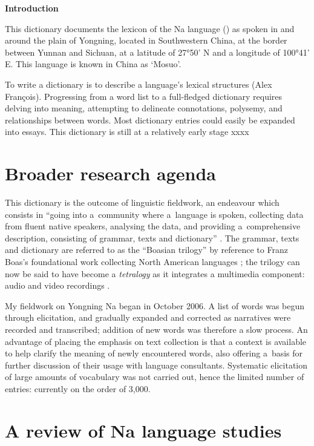 	{\LARGE \textbf{Introduction}}

This dictionary documents the lexicon of the Na language () as spoken in and around the plain of Yongning, located in Southwestern China, at the border between Yunnan and Sichuan, at a latitude of 27°50’ N and a longitude of 100°41’ E. This language is known in China as ‘Mosuo'. 

To write a dictionary is to describe a language's lexical structures (Alex François). Progressing from a word list to a full-fledged dictionary requires delving into meaning, attempting to delineate connotations, polysemy, and relationships between words. Most dictionary entries could easily be expanded into essays. This dictionary is still at a relatively early stage xxxx


	\section{Broader research agenda} \label{sec:researchagenda}
	
	This dictionary is the outcome of linguistic fieldwork, an endeavour which consists in “going into a~community
	where a~language is spoken, collecting data from fluent native speakers, analysing the data, and
	providing a~comprehensive description, consisting of grammar, texts and dictionary”
	\citep[12]{Dixon2007}. The grammar, texts and dictionary are referred to as the “Boasian trilogy” \citep{foley1999} by reference to Franz Boas’s foundational work collecting North American languages \citep{boas1902, boasetal1911}; the trilogy can now be said to have become a \textit{tetralogy} as it integrates a multimedia component: audio and video recordings \citep{musgraveetal2014}. 
	
	My fieldwork on Yongning Na began in October 2006. A list of words was begun through elicitation, and gradually expanded and corrected as narratives were recorded and transcribed; addition of new words was therefore a slow process. An advantage of placing the emphasis on text collection is that a context is available to help clarify the meaning of newly encountered words, also offering a~basis for further discussion of their usage with language consultants. Systematic elicitation of large amounts of vocabulary was not carried out, hence the limited number of entries: currently on the order of 3,000.

\section{A review of Na language studies}
\label{sec:previousstudiesofthenalanguage}

